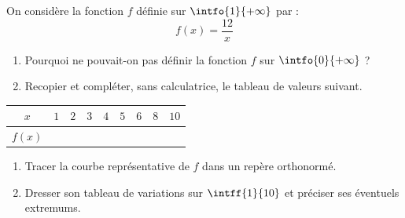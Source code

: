 \begin{exo}{}
	On considère la fonction $f$ définie sur $\intfo{1}{+\infty}$ par :
	\[
		f(x) = \frac{12}{x}
	\]

	\begin{enumerate}
		\item Pourquoi ne pouvait-on pas définir la fonction $f$ sur $\intfo{0}{+\infty}$ ?
		\item Recopier et compléter, sans calculatrice, le tableau de valeurs suivant.
	\end{enumerate}

	\begin{center}
		\def\arraystretch{1.4}
		\begin{tabular}{|c|c|c|c|c|c|c|c|c|} \hline
			$x$    & $1$           & $2$           & $3$           & $4$           & $5$           & $6$           & $8$           & $10$          \\ \hline
			$f(x)$ & \phantom{xxx} & \phantom{xxx} & \phantom{xxx} & \phantom{xxx} & \phantom{xxx} & \phantom{xxx} & \phantom{xxx} & \phantom{xxx} \\ \hline
		\end{tabular}
	\end{center}

	\begin{enumerate}[resume]
		\item Tracer la courbe représentative de $f$ dans un repère orthonormé.
		\item Dresser son tableau de variations sur $\intff{1}{10}$ et préciser ses éventuels extremums.
	\end{enumerate}
\end{exo}
